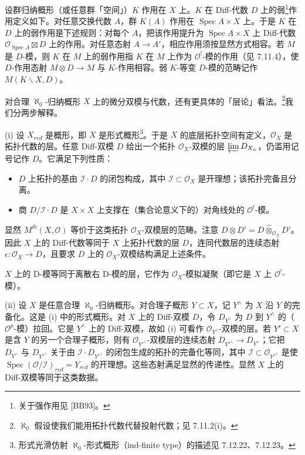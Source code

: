 设群归纳概形（或任意群「空间」）$K$ 作用在 $X$ 上。$K$ 在 Diff-代数 $D$ 上的弱\footnote{关于强作用见 [BB93]。}作用定义如下。对任意交换代数 $A$，群 $K(A)$ 作用在 $\operatorname{Spec}A\times X$ 上。于是 $K$ 在 $D$ 上的弱作用是下述规则：对每个 $A$，把该作用提升为 $\operatorname{Spec}A\times X$ 上 Diff-代数 $\mathcal{O}_{\operatorname{Spec}A}\boxtimes D$ 上的作用。对任意态射 $A\to A'$，相应作用须按显然方式相容。若 $M$ 是 $D$-模，则 $K$ 在 $M$ 上的弱作用指 $K$ 在 $M$ 上作为 $\mathcal{O}^!$-模的作用（见 7.11.4），使 $D$-作用态射 $M\otimes D\to M$ 与 $K$-作用相容。弱 $K$-等变 $D$-模的范畴记作 $M(K\backslash X,D)$。

 对合理 $\aleph_0$-归纳概形 $X$ 上的微分双模与代数，还有更具体的「层论」看法。\footnote{$\aleph_0$ 假设使我们能用拓扑代数代替投射代数；见 7.11.2(i)。}我们分两步解释。

(i) 设 $X_{red}$ 是概形，即 $X$ 是形式概形\footnote{形式光滑仿射 $\aleph_0$-形式概形（ind-finite type）的描述见 7.12.22、7.12.23。}。于是 $X$ 的底层拓扑空间有定义，$\mathcal{O}_X$ 是拓扑代数的层。任意 Diff-双模 $D$ 给出一个拓扑 $\mathcal{O}_X$-双模的层 $\varprojlim D_{X_\alpha}$，仍滥用记号记作 $D$。它满足下列性质：
\begin{itemize}[label=--]
\item $D$ 上拓扑的基由 $\mathcal{I}\cdot D$ 的闭包构成，其中 $\mathcal{I}\subset\mathcal{O}_X$ 是开理想；该拓扑完备且分离。
\item 商 $D/\mathcal{I}\cdot D$ 是 $X\times X$ 上支撑在（集合论意义下的）对角线处的 $\mathcal{O}^!$-模。
\end{itemize}
显然 $M^{di}(X,\mathcal{O})$ 等价于这类拓扑 $\mathcal{O}_X$-双模层的范畴。注意 $D\otimes D'=D\hat{\otimes}_{\mathcal{O}_X}D'$。因此 $X$ 上的 Diff-代数等同于 $X$ 上拓扑代数的层 $D$，连同代数层的连续态射 $\epsilon:\mathcal{O}_X\to D$，且要求 $D$ 上的 $\mathcal{O}_X$-双模结构满足上述条件。


$X$ 上的 D-模等同于离散右 D-模的层，它作为 $\mathcal{O}_X$-模拟凝聚（即它是 $X$ 上 $\mathcal{O}^!$-模）。

(ii) 设 $X$ 是任意合理 $\aleph_0$-归纳概形。对合理子概形 $Y\subset X$，记 $Y^\wedge$ 为 $X$ 沿 $Y$ 的完备化。这是 (i) 中的形式概形。对 $X$ 上的 Diff-双模 $D$，令 $D_{Y^\wedge}$ 为 $D$ 到 $Y^\wedge$ 的（$\mathcal{O}^p$-模）拉回。它是 $Y^\wedge$ 上的 Diff-双模，故如 (i) 可看作 $\mathcal{O}_{Y^\wedge}$-双模的层。若 $Y'\subset X$ 是含 $Y$ 的另一个合理子概形，则有 $\mathcal{O}_{Y'^\wedge}$-双模层的连续态射 $D_{Y'^\wedge}\to D_{Y^\wedge}$；它把 $D_{Y^\wedge}$ 与 $D_{Y'^\wedge}$ 关于由 $\mathcal{I}\cdot D_{Y'^\wedge}$ 的闭包生成的拓扑的完备化等同，其中 $\mathcal{I}\subset\mathcal{O}_{Y'^\wedge}$ 是使 $\operatorname{Spec}(\mathcal{O}/\mathcal{I})_{red}=Y_{red}$ 的开理想。这些态射满足显然的传递性。显然 $X$ 上的 Diff-双模等同于这类数据。

